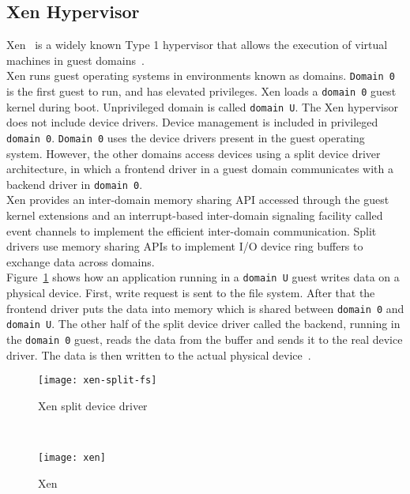 \subsection{Xen Hypervisor}
Xen~\cite{barham2003xen} is a widely known Type 1 hypervisor that allows the execution of virtual machines in guest domains~\cite{king2003operating}. 
\\[3mm]
Xen runs guest operating systems in environments known as domains. \texttt{Domain 0} is the first guest to run, and has elevated privileges. Xen loads a \texttt{domain 0} guest kernel during boot. Unprivileged domain is called \texttt{domain U}. The Xen hypervisor does not include device drivers. Device management is included in privileged \texttt{domain 0}. \texttt{Domain 0} uses the device drivers present in the guest operating system. However, the other domains access devices using a split device driver architecture, in which a frontend driver in a guest domain communicates with a backend driver in \texttt{domain 0}.
\\[3mm]
Xen provides an inter-domain memory sharing API accessed through the guest kernel extensions and an interrupt-based inter-domain signaling facility called event channels to implement the efficient inter-domain communication. Split drivers use memory sharing APIs to implement I/O device ring buffers to exchange data across domains.
\\[3mm]
Figure~\ref{xen-split2} shows how an application running in a \texttt{domain U} guest writes data on a physical device. First, write request is sent to the file system. After that the frontend driver puts the data into memory which is shared between \texttt{domain 0} and \texttt{domain U}. The other half of the split device driver called the backend, running in the \texttt{domain 0} guest, reads the data from the buffer and sends it to the real device driver. The data is then written to the actual physical device~\cite{Chisnall:2007:DGX:1407351}.
\begin{figure}[!h]
\centering
\texttt{[image: xen-split-fs]}
\caption{Xen split device driver}
\label{xen-split2}
\end{figure}
\\[3mm]
\begin{figure}[!h]
\centering
\texttt{[image: xen]}
\caption{Xen}
\label{xen}
\end{figure}
\\[3mm]

